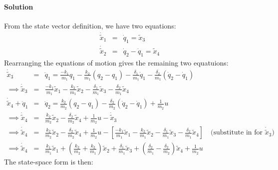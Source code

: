 \documentclass[11pt]{article}
\begin{document}
\paragraph{Solution} From the state vector definition, we have two equations:
\begin{eqnarray*}
    \dot{\tilde{x}}_1 &=& \dot{q}_1 = \tilde{x}_3\\
    \dot{\tilde{x}}_2 &=& \dot{q}_2-\dot{q}_1 = \tilde{x}_4
\end{eqnarray*}
Rearranging the equations of motion gives the remaining two equatuions:
\begin{eqnarray*}
    \dot{\tilde{x}}_3 &=& \ddot{q}_1 = \frac{-k_1}{m_1} q_1
    -\frac{k_2}{m_1}(q_2-q_1)
    -\frac{\delta_1}{m_1}\dot{q}_1
    -\frac{\delta_2}{m_1}(\dot{q}_2-\dot{q}_1)\\
    \implies \dot{\tilde{x}}_3 &=& \frac{-k_1}{m_1} \tilde{x}_1
    -\frac{k_2}{m_1}\tilde{x}_2
    -\frac{\delta_1}{m_1}\tilde{x}_3
    -\frac{\delta_2}{m_1}\tilde{x}_4\\
    \dot{\tilde{x}}_4 + \ddot{q}_1 &=& \ddot{q}_2 = \frac{k_2}{m_2}(q_2-q_1)
    -\frac{\delta_2}{m_2}(\dot{q}_2-\dot{q}_1)
    +\frac{1}{m_2}u\\
    \implies \dot{\tilde{x}}_4 &=& \frac{k_2}{m_2} \tilde{x}_2 - \frac{\delta_2}{m_2}\tilde{x}_4 + \frac{1}{m_2}u - \dot{\tilde{x}}_3\\
    \implies \dot{\tilde{x}}_4 &=& \frac{k_2}{m_2} \tilde{x}_2 - \frac{\delta_2}{m_2}\tilde{x}_4 + \frac{1}{m_2}u - \left[\frac{-k_1}{m_1} \tilde{x}_1
    -\frac{k_2}{m_1}\tilde{x}_2
    -\frac{\delta_1}{m_1}\tilde{x}_3
    -\frac{\delta_2}{m_1}\tilde{x}_4\right]\quad \text{(substitute in for } \dot{\tilde{x}}_3 )\\
    \implies \dot{\tilde{x}}_4 &=& \frac{k_1}{m_1} \tilde{x}_1
    +\left(\frac{k_2}{m_2}+\frac{k_2}{m_1}\right)\tilde{x}_2
    +\frac{\delta_1}{m_1}\tilde{x}_3
    +\left(\frac{\delta_2}{m_1}-\frac{\delta_2}{m_2}\right)\tilde{x}_4
    +\frac{1}{m_2}u
\end{eqnarray*}
The state-space form is then:
\end{document}
